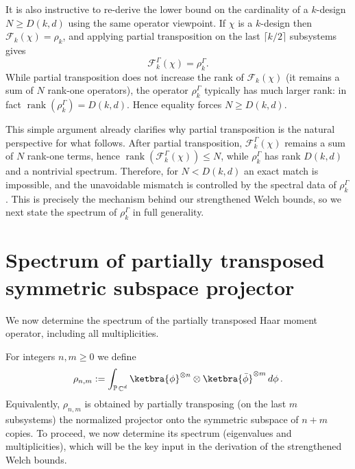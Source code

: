 \documentclass[aps,twocolumn,pra,superscriptaddress,nofootinbib]{revtex4-2}
\DeclareMathOperator{\C}{\mathbb{C}} %
\begin{document}
It is also instructive to re-derive the lower bound on the cardinality of a $k$-design $N\ge D(k,d)$ using the same operator viewpoint.
If $\chi$ is a $k$-design then $\mathcal F_k(\chi)=\rho_k$, and applying partial transposition on the last
$\lceil k/2\rceil$ subsystems gives
\[
\mathcal F_k^{\mathsf{\Gamma}}(\chi)=\rho_k^{\mathsf{\Gamma}}.
\]
While partial transposition does not increase the rank of $\mathcal F_k(\chi)$ (it remains a sum of $N$ rank-one operators),
the operator $\rho_k^{\mathsf{\Gamma}}$ typically has much larger rank: in fact
$\operatorname{rank}(\rho_k^{\mathsf{\Gamma}})=D(k,d)$.
Hence equality forces $N\ge D(k,d)$.

This simple argument already clarifies why partial transposition is the natural perspective for what follows. After partial transposition,
$\mathcal F_k^{\mathsf{\Gamma}}(\chi)$ remains a sum of $N$ rank-one terms, hence
$\operatorname{rank}(\mathcal F_k^{\mathsf{\Gamma}}(\chi))\le N$, while
$\rho_k^{\mathsf{\Gamma}}$ has rank $D(k,d)$ and a nontrivial spectrum. Therefore, for
$N<D(k,d)$ an exact match is impossible, and the unavoidable mismatch is controlled by the spectral data of
$\rho_k^{\mathsf{\Gamma}}$. This is precisely the mechanism behind our strengthened Welch bounds, so we next
state the spectrum of $\rho_k^{\mathsf{\Gamma}}$ in full generality.

\section{Spectrum of partially transposed symmetric subspace projector} \label{sec:spec}
We now determine the spectrum of the partially transposed Haar moment operator, including all multiplicities.

For integers $n,m\ge 0$ we define
\begin{equation}\label{Eq:rho_nm_def}
  \rho_{n,m}
  := \int_{\mathbb{P}\C^{d}} \ketbra{\phi}^{\otimes n} \otimes \ketbra{\bar{\phi}}^{\otimes m}\,d\phi \,.
\end{equation}
Equivalently, \(\rho_{n,m}\) is obtained by partially transposing (on the last \(m\) subsystems) the normalized projector onto the symmetric subspace of \(n+m\) copies.
To proceed, we now determine its spectrum (eigenvalues and multiplicities), which will be the key input in the derivation of the strengthened Welch bounds.
\end{document}
